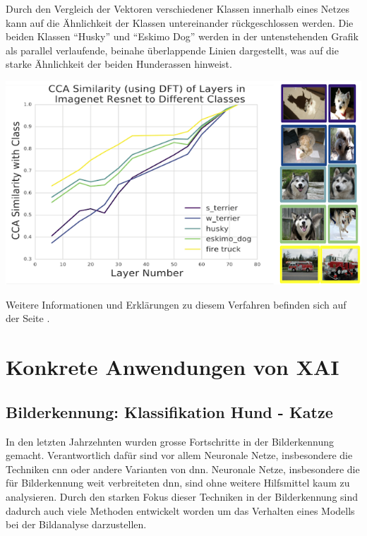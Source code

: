 \documentclass[
  12pt, %
  a4paper, %
  oneside, %
  openany, 
  numbers=noenddot, %
  BCOR=5mm, %
  parskip=half*, %
  thesis, %
]{bfhbook}
\begin{document}
Durch den Vergleich der Vektoren verschiedener Klassen innerhalb eines Netzes kann auf die Ähnlichkeit der Klassen untereinander rückgeschlossen werden. Die beiden Klassen ``Husky'' und ``Eskimo Dog'' werden in der untenstehenden Grafik als parallel verlaufende, beinahe überlappende Linien dargestellt, was auf die starke Ähnlichkeit der beiden Hunderassen hinweist.
\begin{center}
\begin{minipage}[t]{\linewidth}
 	\includegraphics[width=\textwidth]{Bilder/svcca-similarities.png}
\end{minipage}
\end{center}

Weitere Informationen und Erklärungen zu diesem Verfahren befinden sich auf der Seite \parencite{svccaLink}.

\chapter{Konkrete Anwendungen von XAI}

\section{Bilderkennung: Klassifikation Hund - Katze}

In den letzten Jahrzehnten wurden grosse Fortschritte in der Bilderkennung gemacht. Verantwortlich dafür sind vor allem Neuronale Netze, insbesondere die Techniken \acrfull{cnn} oder andere Varianten von \acrfull{dnn}. Neuronale Netze, insbesondere die für Bilderkennung weit verbreiteten \acrshort{dnn}, sind ohne weitere Hilfsmittel kaum zu analysieren.
Durch den starken Fokus dieser Techniken in der Bilderkennung sind dadurch auch viele Methoden entwickelt worden um das Verhalten eines Modells  bei der Bildanalyse darzustellen.
\end{document}
